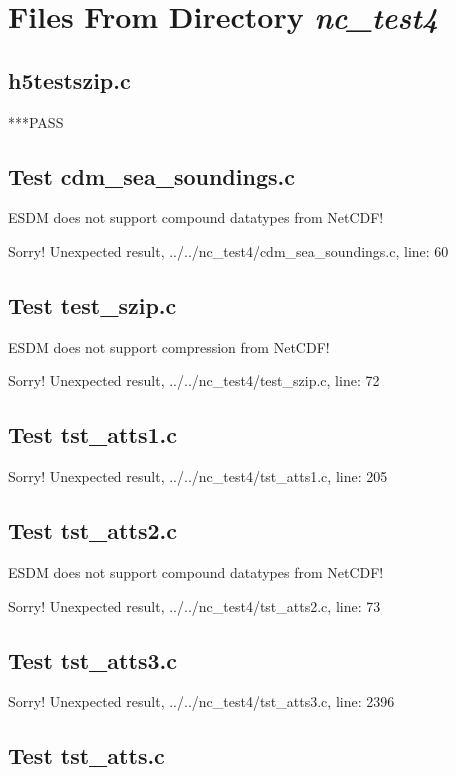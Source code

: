 \chapter{Files From Directory {\textit{nc\_test4}}}

\section{h5testszip.c}

***PASS

\section{Test cdm\_sea\_soundings.c}

ESDM does not support compound datatypes from NetCDF!

Sorry! Unexpected result, ../../nc\_test4/cdm\_sea\_soundings.c, line: 60

\section{Test test\_szip.c}

ESDM does not support compression from NetCDF!

Sorry! Unexpected result, ../../nc\_test4/test\_szip.c, line: 72

\section{Test tst\_atts1.c}

Sorry! Unexpected result, ../../nc\_test4/tst\_atts1.c, line: 205

\section{Test tst\_atts2.c}

ESDM does not support compound datatypes from NetCDF!

Sorry! Unexpected result, ../../nc\_test4/tst\_atts2.c, line: 73

\section{Test tst\_atts3.c}

Sorry! Unexpected result, ../../nc\_test4/tst\_atts3.c, line: 2396

\section{Test tst\_atts.c}


